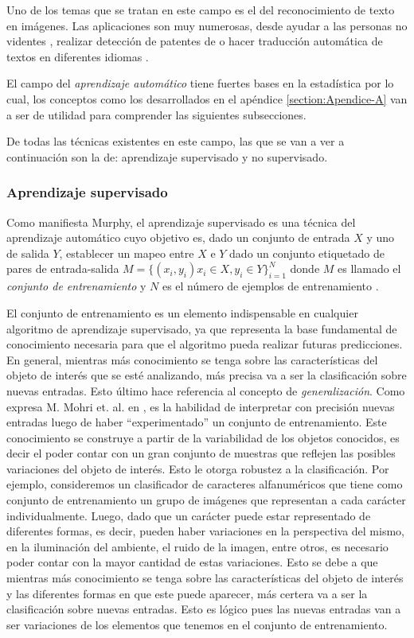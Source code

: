 	Uno de los temas que se tratan en este campo es el del reconocimiento de texto en imágenes. Las aplicaciones son muy numerosas, desde ayudar a las personas no videntes \cite{Optelec}, realizar detección de patentes de \cite{DAB} o hacer traducción automática de textos en diferentes idiomas \cite{WordLens}.
	 
	 El campo del \textit{aprendizaje automático} tiene fuertes bases en la estadística por lo cual, los conceptos como los desarrollados en el apéndice \ref{section:Apendice-A} van a ser de utilidad para comprender las siguientes subsecciones.
	 
	 De todas las técnicas existentes en este campo, las que se van a ver a continuación son la de: aprendizaje supervisado y no supervisado.
	 	
	\subsubsection{Aprendizaje supervisado}
	
	Como manifiesta Murphy, el aprendizaje supervisado es una técnica del aprendizaje automático cuyo objetivo es, dado un conjunto de entrada $X$ y uno de salida $Y$, establecer un mapeo entre $X$ e $Y$ dado un conjunto etiquetado de pares de entrada-salida $M=\{(x_i,y_i) x_i \in X, y_i \in Y \}^{N}_{i=1}$ donde $M$ es llamado el \textit{conjunto de entrenamiento} y $N$ es el número de ejemplos de entrenamiento \cite{Murphy12}.
	
	El conjunto de entrenamiento es un elemento indispensable en cualquier algoritmo de aprendizaje supervisado, ya que representa la base fundamental de conocimiento necesaria para que el algoritmo pueda realizar futuras predicciones. En general, mientras más conocimiento se tenga sobre las características del objeto de interés que se esté analizando, más precisa va a ser la clasificación sobre nuevas entradas. Esto último hace referencia al concepto de \textit{generalización}. Como expresa M. Mohri et. al. en \cite{MMohri}, es la habilidad de interpretar con precisión nuevas entradas luego de haber ``experimentado'' un conjunto de entrenamiento. Este conocimiento se construye a partir de la variabilidad de los objetos conocidos, es decir el poder contar con un gran conjunto de muestras que reflejen las posibles variaciones del objeto de interés. Esto le otorga robustez a la clasificación. Por ejemplo, consideremos un clasificador de caracteres alfanuméricos que tiene como conjunto de entrenamiento un grupo de imágenes que representan a cada carácter individualmente. Luego, dado que un carácter puede estar representado de diferentes formas, es decir, pueden haber variaciones en la perspectiva del mismo, en la iluminación del ambiente, el ruido de la imagen, entre otros, es necesario poder contar con la mayor cantidad de estas variaciones. Esto se debe a que mientras más conocimiento se tenga sobre las características del objeto de interés y las diferentes formas en que este puede aparecer, más certera va a ser la clasificación sobre nuevas entradas. Esto es lógico pues las nuevas entradas van a ser variaciones de los elementos que tenemos en el conjunto de entrenamiento.
	
